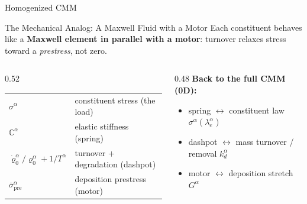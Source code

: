 \begin{frame}[t]{}
  \vfill\begin{center}{\Huge\color{YaleBlue} Homogenized CMM}
  \end{center}\vfill
\end{frame}


\begin{frame}[t]{The Mechanical Analog: A Maxwell Fluid with a Motor}
  Each constituent behaves like a \textbf{Maxwell element in parallel with a
  motor}: turnover relaxes stress toward a \emph{prestress}, not zero.
  \begin{center}\maxwellelement[0.78]\end{center}
  \begin{columns}[T]
    \begin{column}{0.52\textwidth}
      \footnotesize
      \renewcommand{\arraystretch}{1.5}
      \begin{tabular}{@{}ll@{}}
        $\sigma^{\alpha}$ & constituent stress (the load)\\[2pt]
        $\mathbb{C}^{\alpha}$ & elastic stiffness (spring)\\[2pt]
        $\dot\varrho_0^{\alpha}/\varrho_0^{\alpha}+1/T^{\alpha}$ & turnover + degradation (dashpot)\\[2pt]
        $\bar\sigma^{\alpha}_{\text{pre}}$ & deposition prestress (motor)\\
      \end{tabular}
    \end{column}
    \begin{column}{0.48\textwidth}
      \footnotesize \textbf{Back to the full CMM (0D):}
      \begin{itemize}\itemsep3pt
        \item spring $\leftrightarrow$ constituent law $\sigma^{\alpha}(\lambda_e^{\alpha})$
        \item dashpot $\leftrightarrow$ mass turnover / removal $k_d^{\alpha}$
        \item motor $\leftrightarrow$ deposition stretch $G^{\alpha}$
      \end{itemize}
    \end{column}
  \end{columns}
\end{frame}

